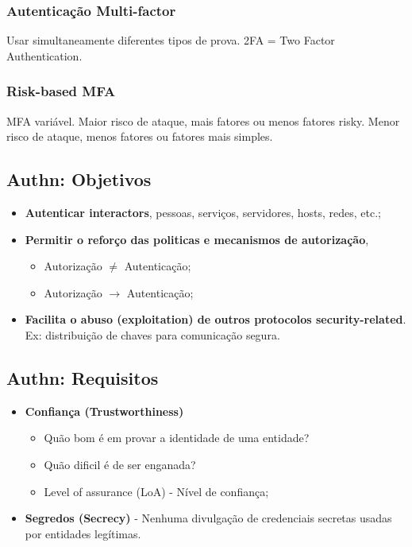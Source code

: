 \documentclass{article}
\begin{document}
\subsubsection{Autenticação Multi-factor}

Usar simultaneamente diferentes tipos de prova. 2FA = Two Factor Authentication.

\subsubsection{Risk-based MFA}

MFA variável. Maior risco de ataque, mais fatores ou menos fatores risky.
Menor risco de ataque, menos fatores ou fatores mais simples.

\subsection{Authn: Objetivos}

\begin{itemize}
  \item \textbf{Autenticar interactors}, pessoas, serviços, servidores,
  hosts, redes, etc.;
  \item \textbf{Permitir o reforço das politicas e mecanismos de autorização},
  \begin{itemize}
    \item Autorização $\neq$ Autenticação;
    \item Autorização $\rightarrow$ Autenticação;
  \end{itemize}

  \item \textbf{Facilita o abuso (exploitation) de outros protocolos security-related}.
  Ex: distribuição de chaves para comunicação segura.
\end{itemize}

\subsection{Authn: Requisitos}

\begin{itemize}
  \item \textbf{Confiança (Trustworthiness)}
  \begin{itemize}
    \item Quão bom é em provar a identidade de uma entidade?
    \item Quão dificil é de ser enganada?
    \item Level of assurance (LoA) - Nível de confiança;
  \end{itemize}

  \item \textbf{Segredos (Secrecy)} - Nenhuma divulgação de credenciais secretas usadas por entidades legítimas.
\end{itemize}
\end{document}
